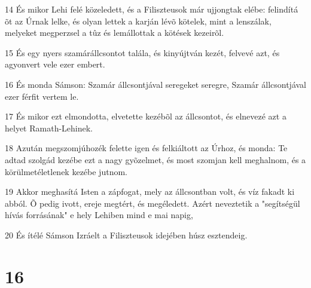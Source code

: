 \par 14 És mikor Lehi felé közeledett, és a Filiszteusok már ujjongtak elébe: felindítá õt az Úrnak lelke, és olyan lettek a karján lévõ kötelek, mint a lenszálak, melyeket megperzsel a tûz és lemállottak a kötések kezeirõl.
\par 15 És egy nyers szamárállcsontot talála, és kinyújtván kezét, felvevé azt, és agyonvert vele ezer embert.
\par 16 És monda Sámson: Szamár állcsontjával seregeket seregre, Szamár állcsontjával ezer férfit vertem le.
\par 17 És mikor ezt elmondotta, elvetette kezébõl az állcsontot, és elnevezé azt a helyet Ramath-Lehinek.
\par 18 Azután megszomjúhozék felette igen és felkiáltott az Úrhoz, és monda: Te adtad szolgád kezébe ezt a nagy gyõzelmet, és most szomjan kell meghalnom, és a körülmetéletlenek kezébe jutnom.
\par 19 Akkor meghasítá Isten a zápfogat, mely az állcsontban volt, és víz fakadt ki abból. Õ pedig ivott, ereje megtért, és megéledett. Azért neveztetik a "segítségül hívás forrásának" e hely Lehiben mind e mai napig,
\par 20 És ítélé Sámson Izráelt a Filiszteusok idejében húsz esztendeig.

\chapter{16}

